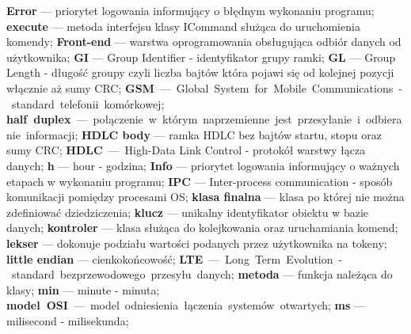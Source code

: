 \textbf{Error} --- priorytet logowania informujący o błędnym wykonaniu programu;\newline
\textbf{execute} --- metoda interfejsu klasy ICommand służąca do uruchomienia komendy;\newline
\textbf{Front-end} --- warstwa oprogramowania obsługująca odbiór danych od użytkownika;\newline
\textbf{GI} --- Group Identifier - identyfikator grupy ramki;\newline
\textbf{GL} --- Group Length - długość groupy czyli liczba bajtów która pojawi się od kolejnej pozycji włącznie aż sumy CRC;\newline
\textbf{GSM} --- Global System for Mobile Communications - standard telefonii komórkowej;\newline
\textbf{half duplex} --- połączenie w którym naprzemienne jest przesyłanie i odbieranie informacji;\newline
\textbf{HDLC body} --- ramka HDLC bez bajtów startu, stopu oraz sumy CRC;\newline
\textbf{HDLC} --- High-Data Link Control - protokół warstwy łącza danych;\newline
\textbf{h} --- hour - godzina;\newline
\textbf{Info} --- priorytet logowania informujący o ważnych etapach w wykonaniu programu;\newline
\textbf{IPC} --- Inter-process communication - sposób komunikacji pomiędzy procesami OS;\newline
\textbf{klasa finalna} --- klasa po której nie można zdefiniować dziedziczenia;\newline
\textbf{klucz} --- unikalny identyfikator obiektu w bazie danych;\newline
\textbf{kontroler} --- klasa służąca do kolejkowania oraz uruchamiania komend;\newline
\textbf{lekser} --- dokonuje podziału wartości podanych przez użytkownika na tokeny;\newline
\textbf{little endian} --- cienkokońcowość;\newline
\textbf{LTE} --- Long Term Evolution - standard bezprzewodowego przesyłu danych;\newline
\textbf{metoda} --- funkcja należąca do klasy;\newline
\textbf{min} --- minute - minuta;\newline
\textbf{model OSI} --- model odniesienia łączenia systemów otwartych;\newline
\textbf{ms} --- milisecond - milisekunda;\newline
